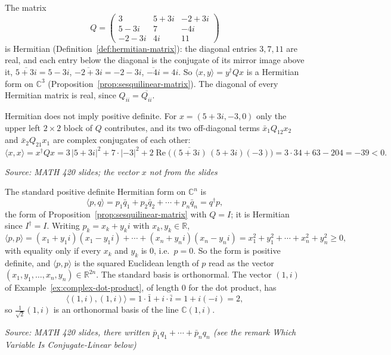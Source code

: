 \documentclass[11pt]{report}
\newcommand{\srcline}[1]{\par\hfill{\footnotesize\textit{Source: #1}}}
\begin{document}
\begin{exbox}\label{ex:hermitian-matrix}
The matrix
\[ Q = \begin{pmatrix} 3 & 5 + 3i & -2 + 3i \\ 5 - 3i & 7 & -4i \\ -2 - 3i & 4i & 11 \end{pmatrix} \]
is Hermitian (Definition~\ref{def:hermitian-matrix}): the diagonal entries $3, 7, 11$ are real, and each entry below the diagonal is the conjugate of its mirror image above it, $\overline{5 + 3i} = 5 - 3i$, $\overline{-2 + 3i} = -2 - 3i$, $\overline{-4i} = 4i$. So $\langle x, y \rangle = y^\dagger Q x$ is a Hermitian form on $\mathbb{C}^3$ (Proposition~\ref{prop:sesquilinear-matrix}). The diagonal of every Hermitian matrix is real, since $Q_{ii} = \overline{Q_{ii}}$.

Hermitian does not imply positive definite. For $x = (5 + 3i, -3, 0)$ only the upper left $2 \times 2$ block of $Q$ contributes, and its two off-diagonal terms $\bar x_1 Q_{12} x_2$ and $\bar x_2 Q_{21} x_1$ are complex conjugates of each other:
\[ \langle x, x \rangle = x^\dagger Q x = 3\,|5 + 3i|^2 + 7 \cdot |{-3}|^2 + 2 \operatorname{Re}\!\big(\overline{(5 + 3i)}\,(5 + 3i)(-3)\big) = 3 \cdot 34 + 63 - 204 = -39 < 0. \]
\srcline{MATH 420 slides; the vector $x$ not from the slides}
\end{exbox}

\begin{exbox}\label{ex:standard-hermitian-form}
The standard positive definite Hermitian form on $\mathbb{C}^n$ is
\[ \langle p, q \rangle = p_1 \bar q_1 + p_2 \bar q_2 + \cdots + p_n \bar q_n = q^\dagger p, \]
the form of Proposition~\ref{prop:sesquilinear-matrix} with $Q = I$; it is Hermitian since $I^\dagger = I$. Writing $p_k = x_k + y_k i$ with $x_k, y_k \in \mathbb{R}$,
\[ \langle p, p \rangle = (x_1 + y_1 i)(x_1 - y_1 i) + \cdots + (x_n + y_n i)(x_n - y_n i) = x_1^2 + y_1^2 + \cdots + x_n^2 + y_n^2 \geq 0, \]
with equality only if every $x_k$ and $y_k$ is $0$, i.e.\ $p = 0$. So the form is positive definite, and $\langle p, p \rangle$ is the squared Euclidean length of $p$ read as the vector $(x_1, y_1, \ldots, x_n, y_n) \in \mathbb{R}^{2n}$. The standard basis is orthonormal. The vector $(1, i)$ of Example~\ref{ex:complex-dot-product}, of length $0$ for the dot product, has
\[ \langle (1, i), (1, i) \rangle = 1 \cdot \bar 1 + i \cdot \bar i = 1 + i(-i) = 2, \]
so $\tfrac{1}{\sqrt2}(1, i)$ is an orthonormal basis of the line $\mathbb{C}(1, i)$.
\srcline{MATH 420 slides, there written $\bar p_1 q_1 + \cdots + \bar p_n q_n$ (see the remark \emph{Which Variable Is Conjugate-Linear} below)}
\end{exbox}
\end{document}
